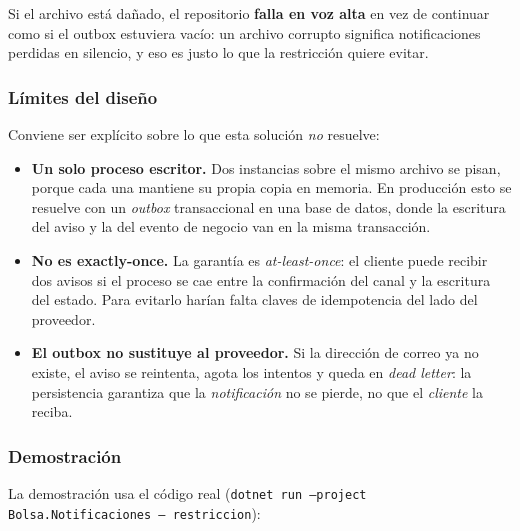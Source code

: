Si el archivo está dañado, el repositorio \textbf{falla en voz alta} en vez de continuar como si
el outbox estuviera vacío: un archivo corrupto significa notificaciones perdidas en silencio, y
eso es justo lo que la restricción quiere evitar.

\subsubsection{Límites del diseño}

Conviene ser explícito sobre lo que esta solución \emph{no} resuelve:

\begin{itemize}
  \item \textbf{Un solo proceso escritor.} Dos instancias sobre el mismo archivo se pisan, porque
        cada una mantiene su propia copia en memoria. En producción esto se resuelve con un
        \emph{outbox} transaccional en una base de datos, donde la escritura del aviso y la del
        evento de negocio van en la misma transacción.
  \item \textbf{No es exactly-once.} La garantía es \emph{at-least-once}: el cliente puede recibir
        dos avisos si el proceso se cae entre la confirmación del canal y la escritura del estado.
        Para evitarlo harían falta claves de idempotencia del lado del proveedor.
  \item \textbf{El outbox no sustituye al proveedor.} Si la dirección de correo ya no existe, el
        aviso se reintenta, agota los intentos y queda en \emph{dead letter}: la persistencia
        garantiza que la \emph{notificación} no se pierde, no que el \emph{cliente} la reciba.
\end{itemize}

\subsubsection{Demostración}

La demostración usa el código real (\texttt{dotnet run --project Bolsa.Notificaciones --
restriccion}):

